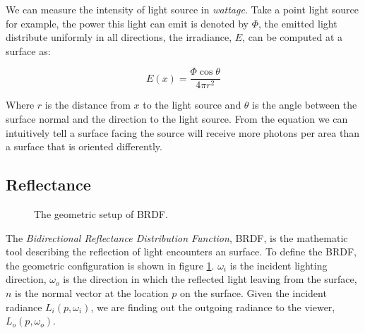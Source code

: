 We can measure the intensity of light source in \emph{wattage}. Take a point light source for example, the power this light can emit is denoted by \(\Phi\), the emitted light distribute uniformly in all directions, the irradiance, \(E\), can be computed at a surface as: 

\begin{equation}
E(x) = \frac{\Phi \cos{\theta}}{4\pi r^{2}} 
\end{equation}

Where \(r\) is the distance from \(x\) to the light source and \(\theta\) is the angle between the surface normal and the direction to the light source. From the equation we can intuitively tell a surface facing the source will receive more photons per area than a surface that is oriented differently.   

\subsection{Reflectance} 
\begin{figure}[htp] 
    \centering 
    \renewcommand{\thefigure}{\thechapter.\arabic{figure}}
    \caption[Geometric setup of BRDF]{The geometric setup of BRDF. }
    \label{fig:brdf} 
\end{figure} 

The \emph{Bidirectional Reflectance Distribution Function}, BRDF, is the mathematic tool describing the reflection of light encounters an surface. To define the BRDF, the geometric configuration is shown in figure \ref{fig:brdf}. \(\omega_{i}\) is the incident lighting direction, \(\omega_{o}\) is the direction in which the reflected light leaving from the surface, \(n\) is the normal vector at the location \(p\) on the surface. Given the incident radiance \(L_{i}(p, \omega_{i})\), we are finding out the outgoing radiance to the viewer, \(L_{o}(p, \omega_{o})\). 

